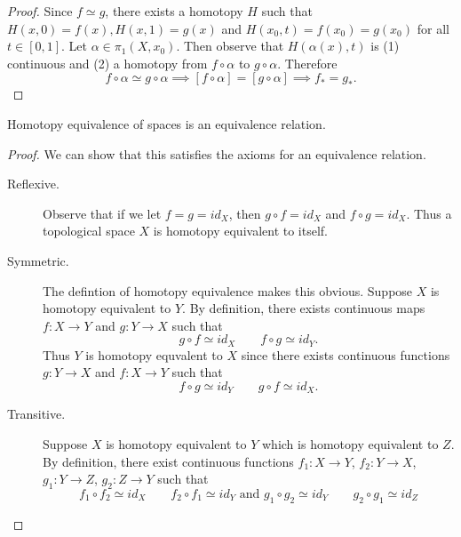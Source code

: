 \documentclass[a4paper,12pt,twoside]{hmcpset}
\begin{document}
\begin{proof}
    Since $f \simeq g$, there exists a homotopy $H$ such that $H(x, 0)
    = f(x), H(x, 1) = g(x)$ and $H(x_0, t) = f(x_0) = g(x_0)$ for all
    $t \in [0, 1]$. Let $\alpha \in \pi_1(X, x_0)$. Then observe that 
    $H(\alpha(x), t)$ is (1) continuous and (2) a homotopy from $f
    \circ \alpha$ to $g \circ \alpha$. Therefore 
    \[
        f \circ \alpha \simeq g \circ \alpha \implies [f \circ \alpha] = [g \circ \alpha]
        \implies f_* = g_*.
    \]
\end{proof}

\begin{problem}[Lemma 13.23]
    Homotopy equivalence of spaces is an equivalence relation.
\end{problem}

\begin{proof}
    We can show that this satisfies the axioms for an equivalence
    relation.
    \begin{description}
        \item[Reflexive.] Observe that if we let $f = g = id_X$,
        then $g \circ f = id_X$ and $f \circ g = id_X$. 
        Thus a topological space $X$ is homotopy
        equivalent to itself. 

        \item[Symmetric.] The defintion of homotopy equivalence makes
        this obvious.
        Suppose $X$ is homotopy equivalent to $Y$.
        By definition, there exists continuous maps $f: X \to Y$ and
        $g: Y \to X$ such that 
        \[
            g \circ f \simeq id_X \qquad f \circ g \simeq id_Y.  
        \]
        Thus $Y$ is homotopy equvalent to $X$ since there exists
        continuous functions $g: Y \to X$ and $f: X \to Y$ such that 
        \[
            f \circ g \simeq id_Y \qquad g \circ f \simeq id_X.  
        \]

        \item[Transitive.] Suppose $X$ is homotopy equivalent to $Y$
        which is homotopy equivalent to $Z$. By definition, there
        exist continuous functions $f_1 : X \to Y$, $f_2: Y \to X$, 
        $g_1 : Y \to Z$, $g_2 : Z \to Y$ such that 
        \[
            f_1 \circ f_2 \simeq id_X \qquad f_2 \circ f_1 \simeq id_Y
            \text{ and } g_1 \circ g_2 \simeq id_Y \qquad g_2 \circ g_1 \simeq id_Z
        \]
        
    \end{description}
\end{proof}
\end{document}
